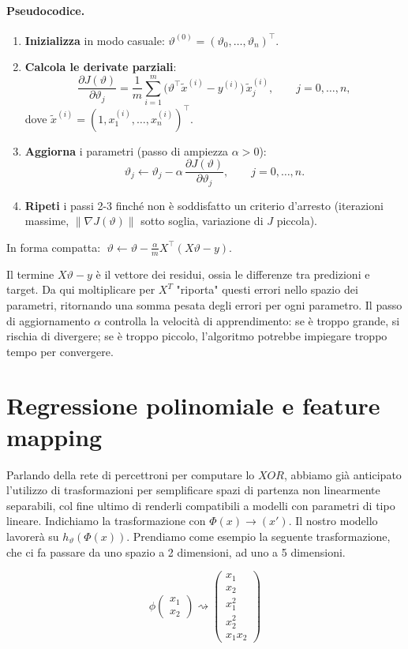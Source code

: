 \paragraph{Pseudocodice.}
\begin{enumerate}
  \item \textbf{Inizializza} in modo casuale: \(\vartheta^{(0)}=(\vartheta_0,\ldots,\vartheta_n)^\top\).
  \item \textbf{Calcola le derivate parziali}:
  \[
  \frac{\partial J(\vartheta)}{\partial \vartheta_j}
  =\frac{1}{m}\sum_{i=1}^m\big(\vartheta^\top \tilde x^{(i)}-y^{(i)}\big)\,\tilde x^{(i)}_j,\qquad j=0,\ldots,n,
  \]
  dove \(\tilde x^{(i)}=(1,x^{(i)}_1,\ldots,x^{(i)}_n)^\top\).
  \item \textbf{Aggiorna} i parametri (passo di ampiezza \(\alpha>0\)):
  \[
  \vartheta_j \leftarrow \vartheta_j - \alpha\,\frac{\partial J(\vartheta)}{\partial \vartheta_j},
  \qquad j=0,\ldots,n.
  \]
  \item \textbf{Ripeti} i passi 2-3 finché non è soddisfatto un criterio d'arresto
  (iterazioni massime, \(\|\nabla J(\vartheta)\|\) sotto soglia, variazione di \(J\) piccola).
\end{enumerate}
In forma compatta: \(\;\vartheta \leftarrow \vartheta - \frac{\alpha}{m}X^\top(X\vartheta-y)\).

Il termine $X\vartheta - y$ è il vettore dei residui, ossia le differenze tra predizioni e target. Da qui moltiplicare per $X^T$ "riporta" questi errori nello spazio dei parametri, ritornando una somma pesata degli errori per ogni parametro. Il passo di aggiornamento \(\alpha\) controlla la velocità di apprendimento: se è troppo grande, si rischia di divergere; se è troppo piccolo, l'algoritmo potrebbe impiegare troppo tempo per convergere.

\section{Regressione polinomiale e feature mapping}
Parlando della rete di percettroni per computare lo $XOR$, abbiamo già anticipato l'utilizzo di trasformazioni per semplificare spazi di partenza non linearmente separabili, col fine ultimo di renderli compatibili a modelli con parametri di tipo lineare. Indichiamo la trasformazione con $\Phi(x) \to (x')$. Il nostro modello lavorerà su $h_\vartheta(\Phi(x))$. Prendiamo come esempio la seguente trasformazione, che ci fa passare da uno spazio a 2 dimensioni, ad uno a 5 dimensioni.

$$
\phi \begin{pmatrix}
	x_1\\
	x_2
\end{pmatrix} \rightsquigarrow \begin{pmatrix}
	x_1\\
	x_2\\
	x_1^2\\
	x_2^2\\
	x_1 x_2
\end{pmatrix}
$$

